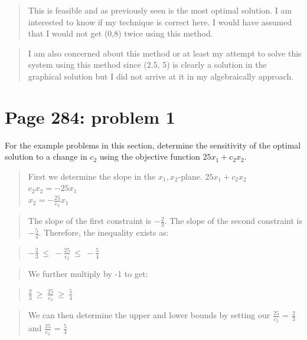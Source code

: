 \documentclass[]{article}
\begin{document}
\begin{quote}
This is feasible and as previously seen is the most optimal solution. I
am interested to know if my technique is correct here. I would have
assumed that I would not get (0,8) twice using this method.
\end{quote}

\begin{quote}
I am also concerned about this method or at least my attempt to solve
this system using this method since (2.5, 5) is clearly a solution in
the graphical solution but I did not arrive at it in my algebraically
approach.
\end{quote}

\section{Page 284: problem 1}\label{page-284-problem-1}

For the example problems in this section, determine the sensitivity of
the optimal solution to a change in \(c_2\) using the objective function
\(25x_1 + c_2x_2\).

\begin{quote}
First we determine the slope in the \(x_1,x_2\)-plane.
\(25x_1 + c_2x_2\)\\
\(c_2x_2 = -25x_1\)\\
\(x_2 = -\frac{25}{c_2}x_1\)
\end{quote}

\begin{quote}
The slope of the first constraint is \(-\frac{2}{3}\). The slope of the
second constraint is \(-\frac{5}{4}\). Therefore, the inequality exists
as:
\end{quote}

\begin{quote}
\(-\frac{2}{3}~\leq~-\frac{25}{c_2}~\leq~-\frac{5}{4}\)
\end{quote}

\begin{quote}
We further multiply by -1 to get:
\end{quote}

\begin{quote}
\(\frac{2}{3}~\geq~\frac{25}{c_2}~\geq~\frac{5}{4}\)
\end{quote}

\begin{quote}
We can then determine the upper and lower bounds by setting our
\(\frac{25}{c_2}\) = \(\frac{2}{3}\) and \(\frac{25}{c_2}\) =
\(\frac{5}{4}\)
\end{quote}
\end{document}
